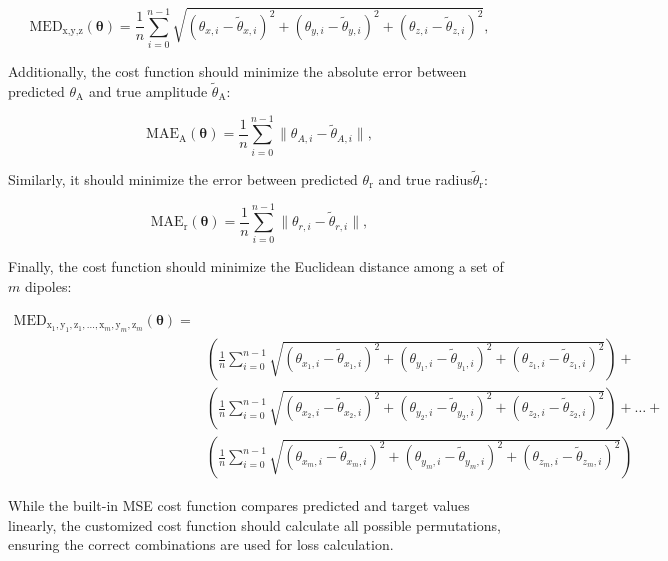 \documentclass[a4paper, UKenglish, 11pt]{uiomaster}
\begin{document}
\begin{equation}
    \text{MED}_{\text{x,y,z}}(\boldsymbol{\theta}) = \frac{1}{n}\sum_{i=0}^{n-1}\sqrt{(\theta_{x,i} - \tilde{\theta}_{x,i})^2 + (\theta_{y,i} - \tilde{\theta}_{y,i})^2 + (\theta_{z,i} - \tilde{\theta}_{z,i})^2},
\label{eq:MED}
\end{equation}

Additionally, the cost function should minimize the absolute error between predicted ${\theta}_{\text{A}}$ and true amplitude $\tilde{\theta}_{\text{A}}$:

\begin{equation}
    \text{MAE}_{\text{A}}(\boldsymbol{\theta}) = \frac{1}{n} \sum_{i=0}^{n-1} \| \theta_{A,i} - \tilde{\theta}_{A,i} \|,
\label{eq:MED}
\end{equation}

Similarly, it should minimize the error between predicted ${\theta}_{\text{r}}$ and true radius$\tilde{\theta}_{\text{r}}$:

\begin{equation}
    \text{MAE}_{\text{r}}(\boldsymbol{\theta}) = \frac{1}{n} \sum_{i=0}^{n-1} \| \theta_{r,i} - \tilde{\theta}_{r,i} \|,
\label{eq:MED}
\end{equation}


Finally, the cost function should minimize the Euclidean distance among a set of $m$ dipoles:

\begin{equation}
\begin{aligned}
    \text{MED}_{\text{x}_1,\text{y}_1,\text{z}_1,\ldots,\text{x}_m,\text{y}_m,\text{z}_m}(\boldsymbol{\theta}) = \\
    &\left( \frac{1}{n}\sum_{i=0}^{n-1}\sqrt{(\theta_{x_1,i} - \tilde{\theta}_{x_1,i})^2 + (\theta_{y_1,i} - \tilde{\theta}_{y_1,i})^2 + (\theta_{z_1,i} - \tilde{\theta}_{z_1,i})^2} \right) + \\
    &\left( \frac{1}{n}\sum_{i=0}^{n-1}\sqrt{(\theta_{x_2,i} - \tilde{\theta}_{x_2,i})^2 + (\theta_{y_2,i} - \tilde{\theta}_{y_2,i})^2 + (\theta_{z_2,i} - \tilde{\theta}_{z_2,i})^2} \right)
    + \ldots + \\
    &\left( \frac{1}{n}\sum_{i=0}^{n-1}\sqrt{(\theta_{x_m,i} - \tilde{\theta}_{x_m,i})^2 + (\theta_{y_m,i} - \tilde{\theta}_{y_m,i})^2 + (\theta_{z_m,i} - \tilde{\theta}_{z_m,i})^2} \right)
\end{aligned}
\label{eq:MED}
\end{equation}

While the built-in MSE cost function compares predicted and target values linearly, the customized cost function should calculate all possible permutations, ensuring the correct combinations are used for loss calculation.
\end{document}
